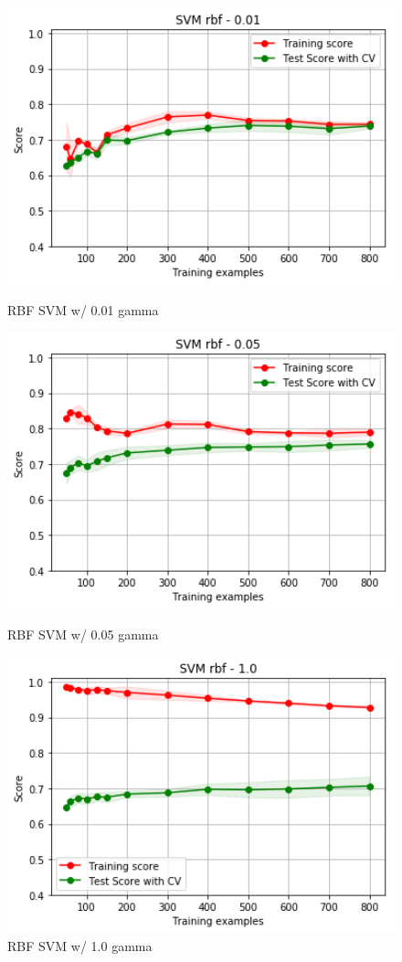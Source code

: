 \documentclass[h]{article}
\begin{document}
\begin{figure}[H]
      \includegraphics[width=1\textwidth,keepaspectratio]{2_svm_rbf_01.png} 
      \caption*{RBF SVM w/ 0.01 gamma} 
   \endminipage\hfill
      \includegraphics[width=1\textwidth,keepaspectratio]{2_svm_rbf_05.png} 
      \caption*{RBF SVM w/ 0.05 gamma} 
   \endminipage\hfill
      \includegraphics[width=1\textwidth,keepaspectratio]{2_svm_rbf_1.png} 
      \caption*{RBF SVM w/ 1.0 gamma} 
   \endminipage\hfill
\end{figure}
\end{document}
